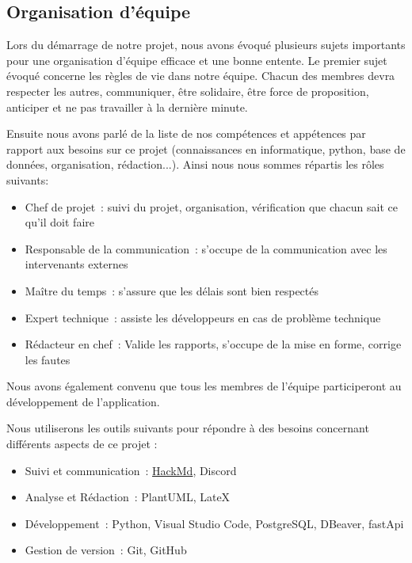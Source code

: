 \documentclass[11pt]{article}
\begin{document}
\subsection{Organisation d'équipe}

Lors du démarrage de notre projet, nous avons évoqué plusieurs sujets importants pour une organisation d'équipe efficace et une bonne entente. Le premier sujet évoqué concerne les règles de vie dans notre équipe. Chacun des membres devra respecter les autres, communiquer, être solidaire, être force de proposition, anticiper et ne pas travailler à la dernière minute.


\bigbreak

Ensuite nous avons parlé de la liste de nos compétences et appétences par rapport aux besoins sur ce projet (connaissances en informatique, python, base de données, organisation, rédaction...). Ainsi nous nous sommes répartis les rôles suivants:
\begin{itemize}
    \item{Chef de projet~: suivi du projet, organisation, vérification que chacun sait ce qu’il doit faire}
    \item{Responsable de la communication~: s'occupe de la communication avec les intervenants externes}
    \item{Maître du temps~: s’assure que les délais sont bien respectés}
    \item{Expert technique~: assiste les développeurs en cas de problème technique}
    \item{Rédacteur en chef~: Valide les rapports, s'occupe de la mise en forme, corrige les fautes}
\end{itemize}

Nous avons également convenu que tous les membres de l'équipe participeront au développement de l'application.

\bigbreak

Nous utiliserons les outils suivants pour répondre à des besoins concernant différents aspects de ce projet :
\begin{itemize}
    \item{Suivi et communication~: \href{https://hackmd.io/CMTCDVW6Spe2PHXOhdKTRQ}{HackMd}, Discord}
    \item{Analyse et Rédaction~: PlantUML, LateX}
    \item{Développement~: Python, Visual Studio Code, PostgreSQL, DBeaver, fastApi}
    \item{Gestion de version~: Git, GitHub}
\end{itemize}
\end{document}
